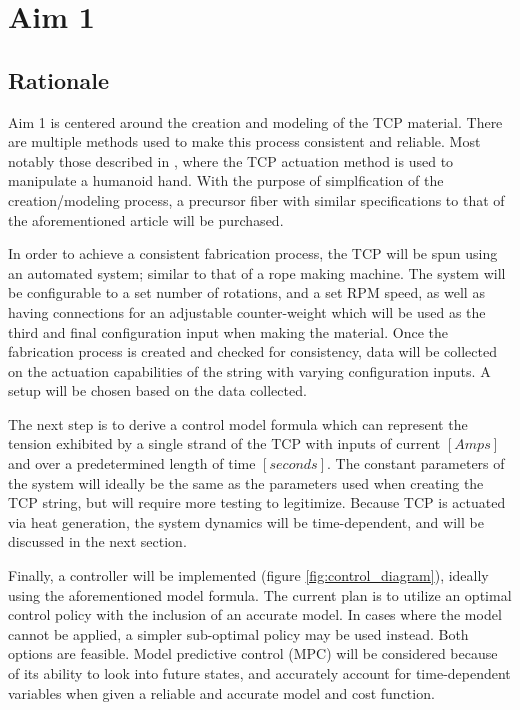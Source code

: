 \section{Aim 1}

\subsection{Rationale}

	Aim 1 is centered around the creation and modeling of the TCP material. There are multiple methods used to make this process consistent and reliable. Most notably those described in \cite{wu_compact_2017}, where the TCP actuation method is used to manipulate a humanoid hand. With the purpose of simplfication of the creation/modeling process, a precursor fiber with similar specifications to that of the aforementioned article will be purchased.

	In order to achieve a consistent fabrication process, the TCP will be spun using an automated system; similar to that of a rope making machine. The system will be configurable to a set number of rotations, and a set RPM speed, as well as having connections for an adjustable counter-weight which will be used as the third and final configuration input when making the material. Once the fabrication process is created and checked for consistency, data will be collected on the actuation capabilities of the string with varying configuration inputs. A setup will be chosen based on the data collected.

	The next step is to derive a control model formula which can represent the tension exhibited by a single strand of the TCP with inputs of current $[Amps]$ and over a predetermined length of time $[seconds]$. The constant parameters of the system will ideally be the same as the parameters used when creating the TCP string, but will require more testing to legitimize. Because TCP is actuated via heat generation, the system dynamics will be time-dependent, and will be discussed in the next section.

	Finally, a controller will be implemented (figure \ref{fig:control_diagram}), ideally using the aforementioned model formula. The current plan is to utilize an optimal control policy with the inclusion of an accurate model. In cases where the model cannot be applied, a simpler sub-optimal policy may be used instead. Both options are feasible. Model predictive control (MPC) will be considered because of its ability to look into future states, and accurately account for time-dependent variables when given a reliable and accurate model and cost function.

